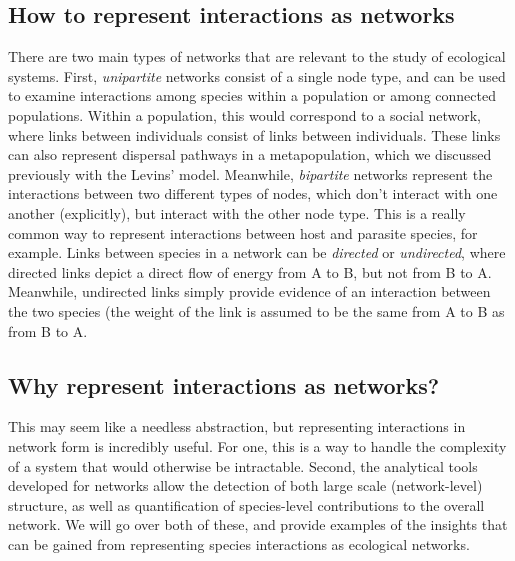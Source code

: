 \documentclass[12pt]{article}
\begin{document}
\subsection*{How to represent interactions as networks}
There are two main types of networks that are relevant to the study of ecological systems. First, \textit{unipartite} networks consist of a single node type, and can be used to examine interactions among species within a population or among connected populations. Within a population, this would correspond to a social network, where links between individuals consist of links between individuals. These links can also represent dispersal pathways in a metapopulation, which we discussed previously with the Levins' model. Meanwhile, \textit{bipartite} networks represent the interactions between two different types of nodes, which don't interact with one another (explicitly), but interact with the other node type. This is a really common way to represent interactions between host and parasite species, for example. Links between species in a network can be \textit{directed} or \textit{undirected}, where directed links depict a direct flow of energy from A to B, but not from B to A. Meanwhile, undirected links simply provide evidence of an interaction between the two species (the weight of the link is assumed to be the same from A to B as from B to A. 










\bigskip
\subsection*{Why represent interactions as networks?}
This may seem like a needless abstraction, but representing interactions in network form is incredibly useful. For one, this is a way to handle the complexity of a system that would otherwise be intractable. Second, the analytical tools developed for networks allow the detection of both large scale (network-level) structure, as well as quantification of species-level contributions to the overall network. We will go over both of these, and provide examples of the insights that can be gained from representing species interactions as ecological networks. 









\bigskip
\end{document}
